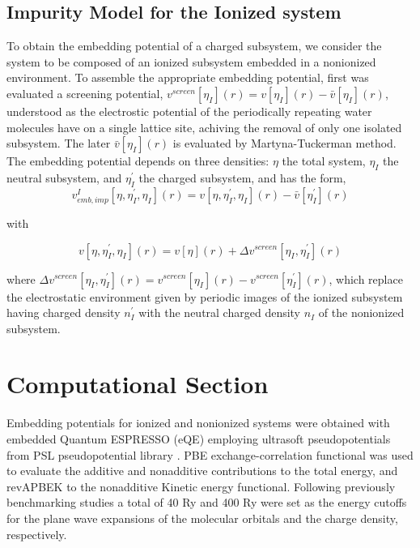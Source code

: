 \documentclass[12pt,a4paper]{article}
\begin{document}
\subsection{Impurity Model for the Ionized system}

To obtain the embedding potential of a charged subsystem, we consider the system to be composed of an ionized subsystem embedded in a nonionized
environment. To assemble the appropriate embedding potential, first was evaluated a screening potential, 
$v^{screen}[\eta_I](r) = v[\eta_I](r) - \bar{v} [\eta_I](r)$, understood as the electrostic potential of the periodically repeating water
molecules have on a single lattice site, achiving the removal of only one isolated subsystem. The later $\bar{v} [\eta_I](r)$ is evaluated by
Martyna-Tuckerman method\cite{martyna1999reciprocal}. The embedding potential depends on three densities: $\eta$ the total system,
$\eta_I$ the neutral subsystem, and $\eta^{'}_I$ the charged subsystem, and has the form, \\

\begin{equation}
	v^I_{emb,imp}[\eta, \eta^{'}_I, \eta_I](r) = v[\eta, \eta^{'}_I, \eta_I](r) - \bar{v}[\eta^{'}_I](r)
\end{equation}

with

\begin{equation}
	v[\eta, \eta^{'}_I, \eta_I](r) = v[\eta](r) + \Delta{v}^{screen}[\eta_I, \eta^{'}_I](r)
\end{equation}

where $\Delta{v}^{screen}[\eta_I, \eta^{'}_I](r) = {v}^{screen}[\eta_I](r) - {v}^{screen}[\eta^{'}_I](r)$, which replace the
electrostatic environment given by periodic images of the ionized subsystem having charged density $n^{'}_I$ with the neutral charged
density $n_I$ of the nonionized subsystem.

\section{Computational Section}

Embedding potentials for ionized and nonionized systems were obtained with embedded Quantum ESPRESSO (eQE) \cite{genova2017eqe}
employing ultrasoft pseudopotentials from PSL pseudopotential library \cite{corso2014comput}. PBE exchange-correlation functional 
\cite{perdew1996phys} was used to evaluate the additive and nonadditive contributions to the total energy, and revAPBEK
\cite{laricchia2011generalized} to the nonadditive Kinetic energy functional. Following previously benchmarking studies
\cite{genova2016avoiding, genova2017cooperation} a total of 40 Ry and 400 Ry were set as the energy cutoffs for the plane wave 
expansions of the molecular orbitals and the charge density, respectively.  \\
\end{document}
